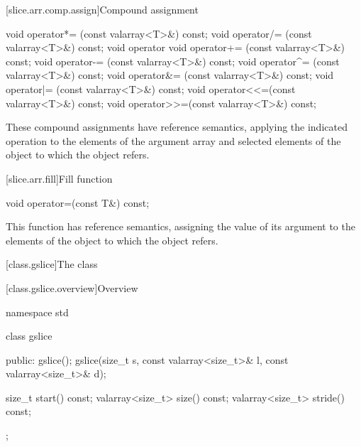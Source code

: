 [slice.arr.comp.assign]{Compound assignment}

%
%
%
%
%
%
%
%
%
%
\begin{itemdecl}
void operator*= (const valarray<T>&) const;
void operator/= (const valarray<T>&) const;
void operator%
void operator+= (const valarray<T>&) const;
void operator-= (const valarray<T>&) const;
void operator^= (const valarray<T>&) const;
void operator&= (const valarray<T>&) const;
void operator|= (const valarray<T>&) const;
void operator<<=(const valarray<T>&) const;
void operator>>=(const valarray<T>&) const;
\end{itemdecl}

\begin{itemdescr}
\pnum
These compound assignments have reference semantics, applying the
indicated operation to the elements of the argument array
and selected elements of the
object to which the
object refers.
\end{itemdescr}

[slice.arr.fill]{Fill function}

%
\begin{itemdecl}
void operator=(const T&) const;
\end{itemdecl}

\begin{itemdescr}
\pnum
This function has reference semantics, assigning the value of its argument
to the elements of the
object to which the
object refers.
\end{itemdescr}

[class.gslice]{The  class}

[class.gslice.overview]{Overview}

%
\begin{codeblock}
namespace std {
  class gslice {
  public:
    gslice();
    gslice(size_t s, const valarray<size_t>& l, const valarray<size_t>& d);

    size_t           start() const;
    valarray<size_t> size() const;
    valarray<size_t> stride() const;
  };
}
\end{codeblock}

